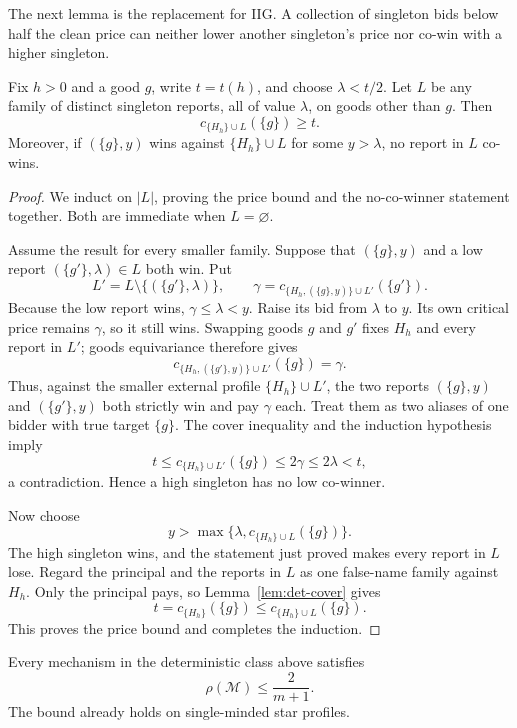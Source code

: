 \documentclass[format=acmsmall, review=false]{acmart}
\begin{document}
The next lemma is the replacement for IIG.  A collection of singleton bids
below half the clean price can neither lower another singleton's price nor
co-win with a higher singleton.

\begin{lemma}
\label{lem:no-iig-half}
Fix $h>0$ and a good $g$, write $t=t(h)$, and choose $\lambda<t/2$.  Let $L$
be any family of distinct singleton reports, all of value $\lambda$, on goods
other than $g$.  Then
\begin{equation}
  c_{\{H_h\}\cup L}(\{g\})\ge t.
  \label{eq:no-iig-half}
\end{equation}
Moreover, if $(\{g\},y)$ wins against $\{H_h\}\cup L$ for some $y>\lambda$, no
report in $L$ co-wins.
\end{lemma}

\begin{proof}
We induct on $|L|$, proving the price bound and the no-co-winner statement
together.  Both are immediate when $L=\varnothing$.

Assume the result for every smaller family.  Suppose that $(\{g\},y)$ and a
low report $(\{g'\},\lambda)\in L$ both win.  Put
\[
  L'=L\setminus\{(\{g'\},\lambda)\},
  \qquad
  \gamma=c_{\{H_h,(\{g\},y)\}\cup L'}(\{g'\}).
\]
Because the low report wins, $\gamma\le\lambda<y$.  Raise its bid from
$\lambda$ to $y$.
Its own critical price remains $\gamma$, so it still wins.  Swapping goods
$g$ and $g'$ fixes $H_h$ and every report in $L'$; goods equivariance
therefore gives
\[
  c_{\{H_h,(\{g'\},y)\}\cup L'}(\{g\})=\gamma.
\]
Thus, against the smaller external profile $\{H_h\}\cup L'$, the two reports
$(\{g\},y)$ and $(\{g'\},y)$ both strictly win and pay $\gamma$ each.  Treat
them as two aliases of one bidder with true target $\{g\}$.  The cover
inequality and the induction hypothesis imply
\[
  t
  \le c_{\{H_h\}\cup L'}(\{g\})
  \le 2\gamma
  \le 2\lambda
  <t,
\]
a contradiction.  Hence a high singleton has no low co-winner.

Now choose
\[
  y>\max\{\lambda,c_{\{H_h\}\cup L}(\{g\})\}.
\]
The high singleton wins, and the statement just proved makes every report in
$L$ lose.  Regard the principal and the reports in $L$ as one false-name
family against $H_h$.  Only the principal pays, so
Lemma~\ref{lem:det-cover} gives
\[
  t=c_{\{H_h\}}(\{g\})
  \le c_{\{H_h\}\cup L}(\{g\}).
\]
This proves the price bound and completes the induction.
\end{proof}

\begin{theorem}
\label{thm:no-iig-upper}
Every mechanism in the deterministic class above satisfies
\[
  \rho(\mathcal M)\le\frac{2}{m+1}.
\]
The bound already holds on single-minded star profiles.
\end{theorem}
\end{document}
